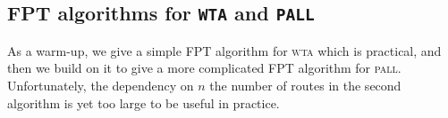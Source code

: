 \documentclass[a4paper,10pt]{article}
\newcommand\pall{\textsc{pall}\xspace}
\newcommand\wta{\textsc{wta}\xspace}
\begin{document}
%   
%     
% 
%     
% 
% 

\subsection{FPT algorithms for \texttt{WTA} and \texttt{PALL}}

As a warm-up, we give a simple FPT algorithm for \wta which is practical,
and then we build on it to give a more complicated FPT algorithm for \pall. Unfortunately, the dependency on $n$ the number of routes in the second algorithm is yet too large to be useful in practice. 
\end{document}
